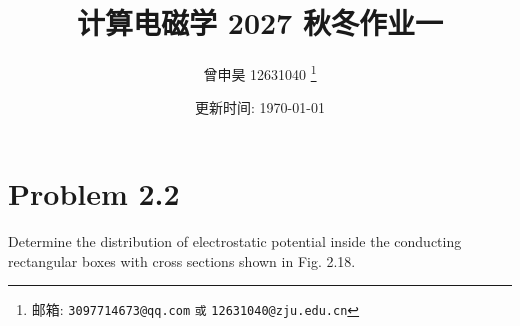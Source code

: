 \documentclass[a4paper]{article}
\begin{document}
\title{计算电磁学 2027 秋冬作业一}

\author{曾申昊 12631040
  \thanks{邮箱: \texttt{3097714673@qq.com}
                            \texttt{或} \texttt{12631040@zju.edu.cn}}}

\date{更新时间: \today}

\maketitle

\section*{Problem 2.2}
 
Determine the distribution of electrostatic potential inside 
the conducting rectangular boxes with cross sections shown in 
Fig. 2.18.
\end{document}

